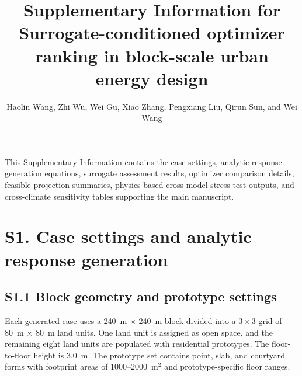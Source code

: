 \documentclass[11pt]{article}
\begin{document}
\title{Supplementary Information for\\
Surrogate-conditioned optimizer ranking in block-scale urban energy design}
\author{Haolin Wang, Zhi Wu, Wei Gu, Xiao Zhang, Pengxiang Liu, Qirun Sun, and Wei Wang}
\date{}
\maketitle

This Supplementary Information contains the case settings, analytic response-generation equations, surrogate assessment results, optimizer comparison details, feasible-projection summaries, physics-based cross-model stress-test outputs, and cross-climate sensitivity tables supporting the main manuscript.

\section*{S1. Case settings and analytic response generation}

\subsection*{S1.1 Block geometry and prototype settings}

Each generated case uses a 240~m $\times$ 240~m block divided into a $3\times3$ grid of 80~m $\times$ 80~m land units. One land unit is assigned as open space, and the remaining eight land units are populated with residential prototypes. The floor-to-floor height is 3.0~m. The prototype set contains point, slab, and courtyard forms with footprint areas of 1000--2000~m$^2$ and prototype-specific floor ranges.
\end{document}
